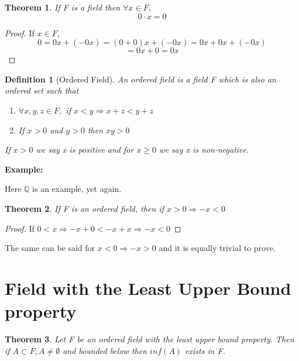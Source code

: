 \documentclass[12pt]{article}
\newtheorem{theorem}{Theorem}
\newtheorem{definition}{Definition}
\begin{document}
\begin{theorem} 
    If F is a field then \(\forall x \in F\), 
    \[ 
        0\cdot x = 0
    \]
\end{theorem}

\begin{proof}
    If \(x\in F\), 
    \[ 
        0 = 0x + (-0x) = (0+0)x+(-0x) = 0x + 0x + (-0x) 
    \]
    \[ 
        = 0x + 0 = 0x
    \]
        
\end{proof}

\begin{definition}[Ordered Field]
    An ordered field is a field F which is also an ordered set such that 
    \begin{enumerate}
        \item \(\forall x,y,z \in F,\) if \(x < y \Rightarrow x+z < y+z\)
        \item If \(x > 0\) and \(y > 0\) then \(xy > 0\)
    \end{enumerate}
    If \(x > 0\) we say x is positive and for \(x \geq 0\) we say x is non-negative.
\end{definition}

\noindent
\textbf{Example:}

\noindent 
Here \(\mathbb Q\) is an example, yet again.

\begin{theorem}
    If F is an ordered field, then if \(x > 0 \Rightarrow -x < 0\)
\end{theorem}
\begin{proof}
    If \(0 < x \Rightarrow -x + 0 < -x + x \Rightarrow -x < 0\)
\end{proof}

\noindent 
The same can be said for \(x<0 \Rightarrow -x > 0\) and it is equally trivial 
to prove.

\break
\section*{Field with the Least Upper Bound property}
\begin{theorem}
    Let F be an ordered field with the least upper bound property.
    Then if \(A \subset F, A \neq \emptyset\) and bounded below then \(inf(A)\) exists 
    in F.
\end{theorem}
\end{document}
